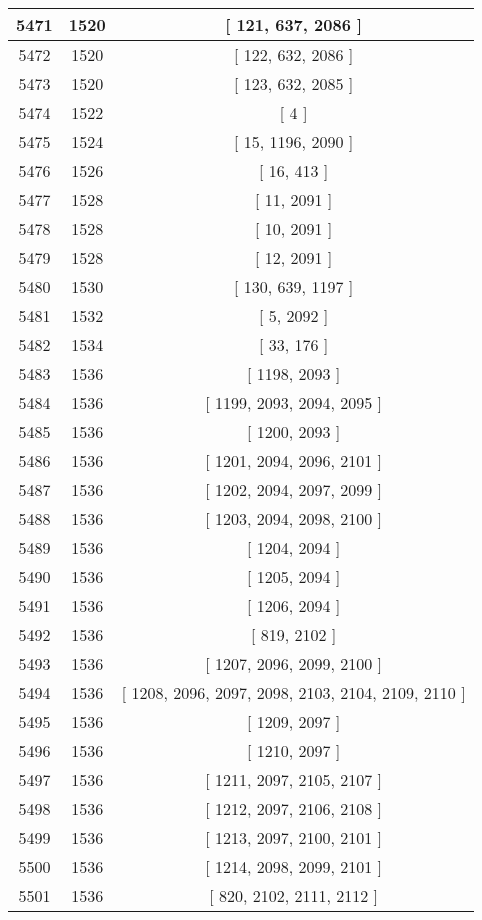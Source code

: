 \begin{center}
\begin{longtable}[H]{|| c c c ||}
\hline
5471 & 1520 & [ 121, 637, 2086 ] \\ 
\hline
5472 & 1520 & [ 122, 632, 2086 ] \\ 
\hline
5473 & 1520 & [ 123, 632, 2085 ] \\ 
\hline
5474 & 1522 & [ 4 ] \\ 
\hline
5475 & 1524 & [ 15, 1196, 2090 ] \\ 
\hline
5476 & 1526 & [ 16, 413 ] \\ 
\hline
5477 & 1528 & [ 11, 2091 ] \\ 
\hline
5478 & 1528 & [ 10, 2091 ] \\ 
\hline
5479 & 1528 & [ 12, 2091 ] \\ 
\hline
5480 & 1530 & [ 130, 639, 1197 ] \\ 
\hline
5481 & 1532 & [ 5, 2092 ] \\ 
\hline
5482 & 1534 & [ 33, 176 ] \\ 
\hline
5483 & 1536 & [ 1198, 2093 ] \\ 
\hline
5484 & 1536 & [ 1199, 2093, 2094, 2095 ] \\ 
\hline
5485 & 1536 & [ 1200, 2093 ] \\ 
\hline
5486 & 1536 & [ 1201, 2094, 2096, 2101 ] \\ 
\hline
5487 & 1536 & [ 1202, 2094, 2097, 2099 ] \\ 
\hline
5488 & 1536 & [ 1203, 2094, 2098, 2100 ] \\ 
\hline
5489 & 1536 & [ 1204, 2094 ] \\ 
\hline
5490 & 1536 & [ 1205, 2094 ] \\ 
\hline
5491 & 1536 & [ 1206, 2094 ] \\ 
\hline
5492 & 1536 & [ 819, 2102 ] \\ 
\hline
5493 & 1536 & [ 1207, 2096, 2099, 2100 ] \\ 
\hline
5494 & 1536 & [ 1208, 2096, 2097, 2098, 2103, 2104, 2109, 2110 ] \\ 
\hline
5495 & 1536 & [ 1209, 2097 ] \\ 
\hline
5496 & 1536 & [ 1210, 2097 ] \\ 
\hline
5497 & 1536 & [ 1211, 2097, 2105, 2107 ] \\ 
\hline
5498 & 1536 & [ 1212, 2097, 2106, 2108 ] \\ 
\hline
5499 & 1536 & [ 1213, 2097, 2100, 2101 ] \\ 
\hline
5500 & 1536 & [ 1214, 2098, 2099, 2101 ] \\ 
\hline
5501 & 1536 & [ 820, 2102, 2111, 2112 ] \\ 

\end{longtable}
\end{center}

